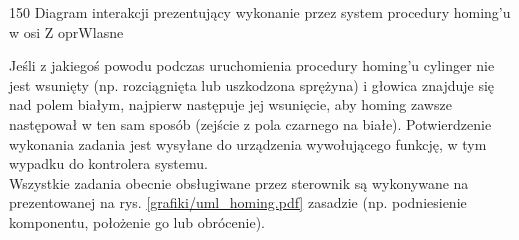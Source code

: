 	{150}
	{Diagram interakcji prezentujący wykonanie przez system procedury homing'u w osi Z}
	{oprWlasne}

Jeśli z jakiegoś powodu podczas uruchomienia procedury homing'u cylinger nie jest wsunięty (np. rozciągnięta lub uszkodzona sprężyna) i głowica znajduje się nad polem białym, najpierw następuje jej wsunięcie, aby homing zawsze następował w ten sam sposób (zejście z pola czarnego na białe). Potwierdzenie wykonania zadania jest wysyłane do urządzenia wywołującego funkcję, w tym wypadku do kontrolera systemu. \\

Wszystkie zadania obecnie obsługiwane przez sterownik są wykonywane na prezentowanej na rys. \ref{grafiki/uml_homing.pdf} zasadzie (np. podniesienie komponentu, położenie go lub obrócenie). 




